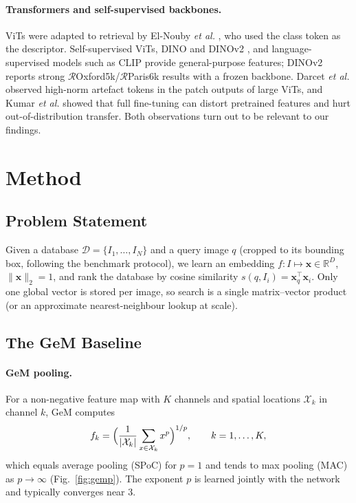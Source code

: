 \documentclass[runningheads]{llncs}
\newcommand{\roxf}{$\mathcal{R}$Oxford5k}
\newcommand{\rpar}{$\mathcal{R}$Paris6k}
\begin{document}
\paragraph{Transformers and self-supervised backbones.}
ViTs \cite{dosovitskiy2021vit} were adapted to retrieval by El-Nouby
\emph{et al.} \cite{elnouby2021vitretrieval}, who used the class token as the
descriptor. Self-supervised ViTs, DINO \cite{caron2021dino} and DINOv2
\cite{oquab2024dinov2}, and language-supervised models such as CLIP
\cite{radford2021clip} provide general-purpose features; DINOv2 reports strong
\roxf{}/\rpar{} results with a frozen backbone. Darcet \emph{et al.}
\cite{darcet2024registers} observed high-norm artefact tokens in the patch
outputs of large ViTs, and Kumar \emph{et al.} \cite{kumar2022distort} showed
that full fine-tuning can distort pretrained features and hurt
out-of-distribution transfer. Both observations turn out to be relevant to our
findings.

\section{Method}
\label{sec:method}

\subsection{Problem Statement}
Given a database $\mathcal{D}=\{I_1,\dots,I_N\}$ and a query image $q$
(cropped to its bounding box, following the benchmark protocol), we learn an
embedding $f:I\mapsto\mathbf{x}\in\mathbb{R}^{D}$, $\|\mathbf{x}\|_2=1$, and
rank the database by cosine similarity $s(q,I_i)=\mathbf{x}_q^\top\mathbf{x}_i$.
Only one global vector is stored per image, so search is a single
matrix--vector product (or an approximate nearest-neighbour lookup at scale).

\subsection{The GeM Baseline}
\label{sec:gem}

\paragraph{GeM pooling.}
For a non-negative feature map with $K$ channels and spatial locations
$\mathcal{X}_k$ in channel $k$, GeM \cite{radenovic2019gem} computes
\begin{equation}
f_k=\Bigl(\frac{1}{|\mathcal{X}_k|}\sum_{x\in\mathcal{X}_k}x^{p}\Bigr)^{1/p},
\qquad k=1,\dots,K,
\label{eq:gem}
\end{equation}
which equals average pooling (SPoC) for $p=1$ and tends to max pooling (MAC)
as $p\rightarrow\infty$ (Fig.~\ref{fig:gemp}). The exponent $p$ is learned
jointly with the network and typically converges near $3$.
\end{document}
